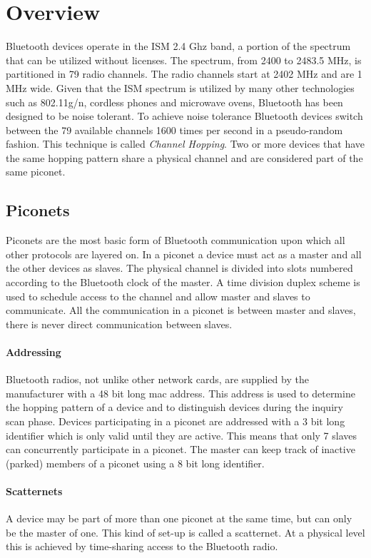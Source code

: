 \section{Overview}
Bluetooth devices operate in the ISM 2.4 Ghz \cite{ISM} band, a portion of the spectrum that can be utilized without licenses.
The spectrum, from 2400 to 2483.5 MHz, is partitioned in 79 radio channels.
The radio channels start at 2402 MHz and are 1 MHz wide.
Given that the ISM spectrum is utilized by many other technologies such as 802.11g/n, cordless phones and microwave ovens, Bluetooth has been designed to be noise tolerant. 
To achieve noise tolerance Bluetooth devices switch between the 79 available channels 1600 times per second in a pseudo-random fashion. This technique is called \emph{Channel Hopping}.
Two or more devices that have the same hopping pattern share a physical channel and are considered part of the same piconet.

\subsection{Piconets}
Piconets are the most basic form of Bluetooth communication upon which all other protocols are layered on.
In a piconet a device must act as a master and all the other devices as slaves.
The physical channel is divided into slots numbered according to the Bluetooth clock of the master.
A time division duplex scheme \cite{TDDp} is used to schedule access to the channel and allow master and slaves to communicate.
All the communication in a piconet is between master and slaves, there is never direct communication between slaves.

\paragraph{Addressing}
Bluetooth radios, not unlike other network cards, are supplied by the manufacturer with a 48 bit long mac address.
This address is used to determine the hopping pattern of a device and to distinguish devices during the inquiry scan phase.
Devices participating in a piconet are addressed with a 3 bit long identifier which is only valid until they are active.
This means that only 7 slaves can concurrently participate in a piconet.
The master can keep track of inactive (parked) members of a piconet using a 8 bit long identifier.

\paragraph{Scatternets}
A device may be part of more than one piconet at the same time, but can only be the master of one. This kind of set-up is called a scatternet.
At a physical level this is achieved by time-sharing access to the Bluetooth radio.

